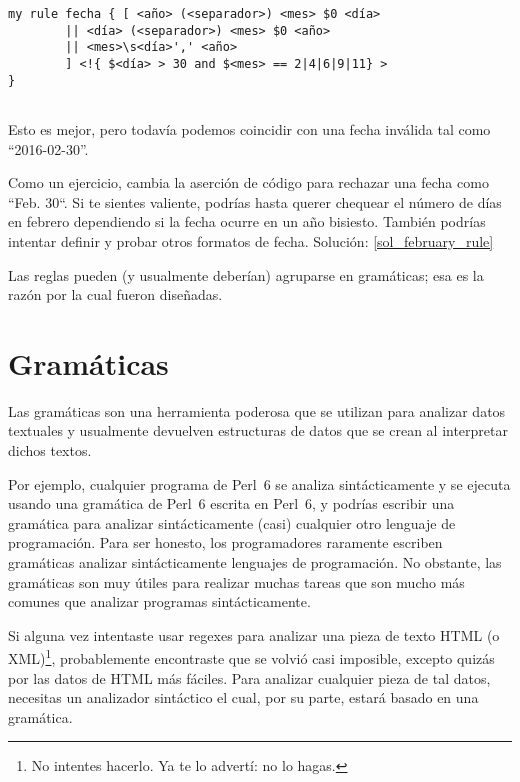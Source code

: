 
\begin{lstlisting}
my rule fecha { [ <año> (<separador>) <mes> $0 <día> 
		|| <día> (<separador>) <mes> $0 <año> 
		|| <mes>\s<día>',' <año>
		] <!{ $<día> > 30 and $<mes> == 2|4|6|9|11} >
}
                        
\end{lstlisting}

Esto es mejor, pero todavía podemos coincidir con una fecha 
inválida tal como ``2016-02-30''.

\begin{exercise}
\label{february_rule}
%
Como un ejercicio, cambia la aserción de código para
rechazar una fecha como ``Feb. 30``. Si te sientes
valiente, podrías hasta querer chequear el número de días
en febrero dependiendo si la fecha ocurre en un año bisiesto.
También podrías intentar definir y probar otros
formatos de fecha. Solución: \ref{sol_february_rule}
\end{exercise}

Las reglas pueden (y usualmente deberían) agruparse en 
gramáticas; esa es la razón por la cual fueron diseñadas.

\section{Gramáticas}

Las gramáticas son una herramienta poderosa que se utilizan
para analizar datos textuales y usualmente devuelven 
estructuras de datos que se crean al interpretar dichos textos.

Por ejemplo, cualquier programa de Perl~6 se analiza sintácticamente
y se ejecuta usando una gramática de Perl~6 escrita en Perl~6, 
y podrías escribir una gramática para analizar sintácticamente
(casi) cualquier otro lenguaje de programación. Para ser honesto,
los programadores raramente escriben gramáticas analizar sintácticamente
lenguajes de programación. No obstante, las gramáticas son muy útiles para
realizar muchas tareas que son mucho más comunes que analizar
programas sintácticamente.

Si alguna vez intentaste usar regexes para analizar una
pieza de texto HTML (o XML)\footnote{No intentes hacerlo.
Ya te lo advertí: no lo hagas.}, probablemente encontraste
que se volvió casi imposible, excepto quizás por las datos
de HTML más fáciles. Para analizar cualquier pieza de tal
datos, necesitas un analizador sintáctico el cual, por su parte,
estará basado en una gramática.

